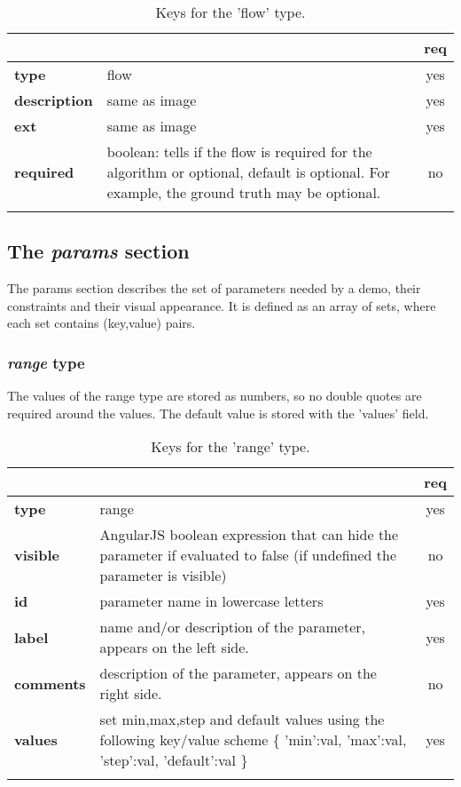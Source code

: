 \begin{longtable}{|>{\bf}L{\linewidth}|L{\linewidth}|c|}
\hline
{}     &  & {\bf req} \tabularnewline 
\hline \hline
 type             & flow & yes \\ \hline
 description      & same as image & yes \\ \hline
 ext              & same as image & yes \\ \hline
 required         & boolean: tells if the flow is required for the algorithm
or optional, default is optional. For example, the ground truth may be optional.& no \\ \hline
\caption{Keys for the 'flow' type.}
\end{longtable}


\subsection{The \emph{params} section}
The params section describes the set of parameters needed by a demo, their 
constraints and their visual appearance. It is defined as an array of sets, 
where each set contains (key,value) pairs.


\subsubsection{ \emph{range} type}

The values of the range type are stored as numbers, so no double quotes are 
required around the values. The default value is stored with the 'values' field.

\begin{longtable}{|>{\bf}L{\linewidth}|L{\linewidth}|c|}
\hline
      &  & {\bf req} 
\tabularnewline \hline \hline
 type  & range       & yes \\ \hline
 visible  & AngularJS boolean expression that can hide the parameter if
            evaluated to false (if undefined the parameter is visible)& no \\ \hline
 id     & parameter name in lowercase letters  & yes \\ \hline
 label  & name and/or description of the parameter, appears on the left side. & yes
                      \\ \hline
 comments & description of the parameter, appears on the right side. & no
                      \\ \hline
 values & set min,max,step and default values using the following key/value 
scheme \{ 'min':val, 'max':val, 'step':val, 'default':val \} & yes
                      \\ \hline
\caption{Keys for the 'range' type.}
\end{longtable}

